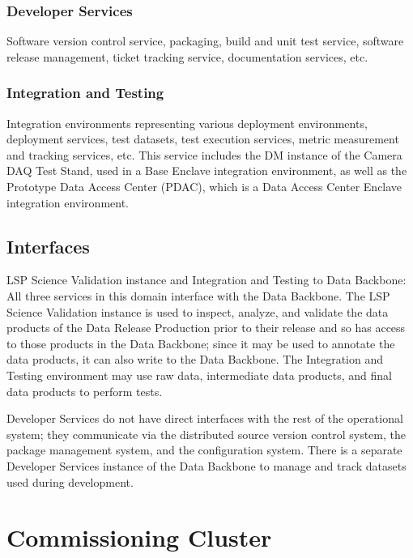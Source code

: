 \documentclass[DM,lsstdraft,toc]{lsstdoc}
\begin{document}
\subsubsection{Developer Services}\label{developer-services}

Software version control service, packaging, build and unit test
service, software release management, ticket tracking service,
documentation services, etc.

\subsubsection{Integration and Testing}\label{integration-and-testing}

Integration environments representing various deployment environments,
deployment services, test datasets, test execution services, metric measurement
and tracking services, etc.  This service includes the DM instance of the
Camera DAQ Test Stand, used in a Base Enclave integration environment, as well
as the Prototype Data Access Center (PDAC), which is a Data Access Center
Enclave integration environment.

\subsection{Interfaces}\label{ncsa-ads-interfaces}

LSP Science Validation instance and Integration and Testing to Data Backbone:
All three services in this domain interface with the Data Backbone.  The LSP
Science Validation instance is used to inspect, analyze, and validate the data
products of the Data Release Production prior to their release and so has
access to those products in the Data Backbone; since it may be used to annotate
the data products, it can also write to the Data Backbone.  The Integration and
Testing environment may use raw data, intermediate data products, and final
data products to perform tests.

Developer Services do not have direct interfaces with the rest of the
operational system; they communicate via the distributed source version control
system, the package management system, and the configuration system.  There is
a separate Developer Services instance of the Data Backbone to manage and track
datasets used during development.


\section{Commissioning Cluster}\label{commissioning-cluster}
\end{document}
